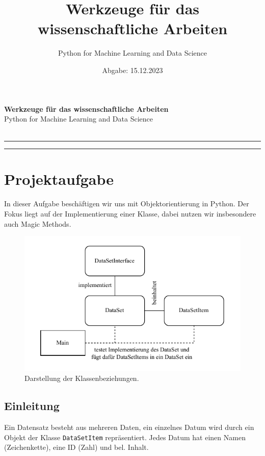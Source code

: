 \documentclass[
    11pt,     
    a4paper,     
    parskip=full
]{article}
\title{\textbf{Werkzeuge für das wissenschaftliche Arbeiten}}
\author{Python for Machine Learning and Data Science}
\date{Abgabe: 15.12.2023}
\begin{document}
    \begin{center}
        \Large \textbf{Werkzeuge für das wissenschaftliche Arbeiten}\\[0.1cm]
        \normalsize Python for Machine Learning and Data Science\\[0.1cm]
        \normalsize{} \\ [0.5cm]
        \hrule %
    \end{center}
    
    \tableofcontents 
    \vspace{0.5cm}
    \hrule %
    
    \section{Projektaufgabe}
        In dieser Aufgabe beschäftigen wir uns mit Objektorientierung in Python.
        Der Fokus liegt auf der Implementierung einer Klasse, dabei nutzen wir insbesondere auch Magic Methods. 
    
        \begin{figure}[h!]
            \centering
            \includegraphics[width=\textwidth]{../diagram/classes_files.pdf}
            \caption{Darstellung der Klassenbeziehungen.}
        \end{figure}
        
        
        \subsection{Einleitung}        
            Ein Datensatz besteht aus mehreren Daten, ein einzelnes Datum wird durch ein Objekt der Klasse \texttt{Data\-Set\-Item} repräsentiert.
            Jedes Datum hat einen Namen (Zeichenkette), eine ID (Zahl) und bel. Inhalt.
            
\end{document}
